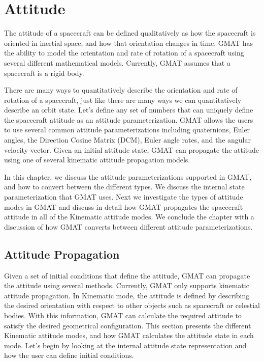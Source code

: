 \section{Attitude} \label{Ch:Attitude}

The attitude of a spacecraft can be defined qualitatively as how the
spacecraft is oriented in inertial space, and how that orientation
changes in time.  GMAT has the ability to model the orientation and
rate of rotation of a spacecraft using several different
mathematical models. Currently, GMAT assumes that a spacecraft is a
rigid body.

There are many ways to quantitatively describe the orientation and
rate of rotation of a spacecraft, just like there are many ways we
can quantitatively describe an orbit state.  Let's define any set of
numbers that can uniquely define the spacecraft attitude as an
attitude parameterization. GMAT allows the users to use several
common attitude parameterizations including quaternions, Euler
angles, the Direction Cosine Matrix (DCM), Euler angle rates, and
the angular velocity vector. Given an initial attitude state, GMAT
can propagate the attitude using one of several kinematic attitude
propagation models.

In this chapter, we discuss the attitude parameterizations supported
in GMAT, and how to convert between the different types.  We discuss
the internal state parameterization that GMAT uses.   Next we
investigate the types of attitude modes in GMAT and discuss in
detail how GMAT propagates the spacecraft attitude in all of the
Kinematic attitude modes.  We conclude the chapter with a discussion
of how GMAT converts between different attitude parameterizations.

\subsection{Attitude Propagation}

Given a set of initial conditions that define the attitude, GMAT can
propagate the attitude using several methods.  Currently, GMAT only
supports kinematic attitude propagation.  In Kinematic mode, the
attitude is defined by describing the desired orientation with
respect to other objects such as spacecraft or celestial bodies.
With this information, GMAT can calculate the required attitude to
satisfy the desired geometrical configuration.  This section
presents the different Kinematic attitude modes, and how GMAT
calculates the attitude state in each mode.  Let's begin by looking
at the internal attitude state representation and how the user can
define initial conditions.


